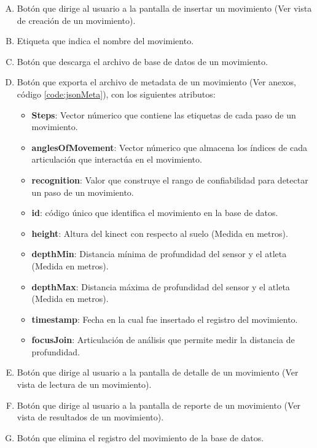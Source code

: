 \begin{enumerate}[A.]
\item Bot\'on que dirige al usuario a la pantalla de insertar un movimiento (Ver vista de creaci\'on de un movimiento).
\item Etiqueta que indica el nombre del movimiento.
\item Bot\'on que descarga el archivo de base de datos de un movimiento.
\item Bot\'on que exporta el archivo de metadata de un movimiento (Ver anexos, c\'odigo \ref{code:jsonMeta}), con los siguientes atributos:
	\begin{itemize}
	\item \textbf{Steps}: Vector n\'umerico que contiene las etiquetas de cada paso de un movimiento.
	\item \textbf{anglesOfMovement}: Vector n\'umerico que almacena los \'indices de cada articulaci\'on que interact\'ua en el movimiento.
	\item \textbf{recognition}: Valor que construye  el rango de confiabilidad para detectar un paso de un movimiento.
	\item \textbf{id}: c\'odigo \'unico que identifica el movimiento en la base de datos.
	\item \textbf{height}: Altura del kinect con respecto al suelo (Medida en metros).	
	\item \textbf{depthMin}: Distancia m\'inima de profundidad del sensor y el atleta (Medida en metros).
	\item \textbf{depthMax}: Distancia m\'axima de profundidad del sensor y el atleta (Medida en metros).
	\item \textbf{timestamp}: Fecha en la cual fue insertado el registro del movimiento.
	\item \textbf{focusJoin}: Articulaci\'on de an\'alisis que permite medir la distancia de profundidad. 
	\end{itemize}
\item Bot\'on que dirige al usuario a la pantalla de detalle de un movimiento (Ver vista de lectura de un movimiento).
\item Bot\'on que dirige al usuario a la pantalla de reporte de un movimiento (Ver vista de resultados de un movimiento).
\item Bot\'on que elimina el registro del movimiento de la base de datos.
\end{enumerate}
